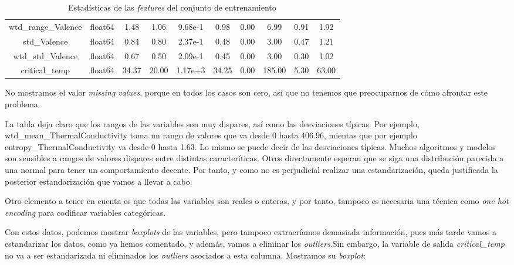 \documentclass[11pt]{article}
\begin{document}
\begin{table}[H]
{\begin{tabular}{|c|c|c|c|c|c|c|c|c|c|}
wtd\_range\_Valence                & float64&     1.48&     1.06&  9.68e-1&     0.98&    0.00&      6.99&     0.91&     1.92 \\
std\_Valence                      & float64&     0.84&     0.80&  2.37e-1&     0.48&    0.00&      3.00&     0.47&     1.21 \\
wtd\_std\_Valence                  & float64&     0.67&     0.50&  2.09e-1&     0.45&    0.00&      3.00&     0.30&     1.02 \\
critical\_temp                    & float64&    34.37&    20.00&  1.17e+3&    34.25&    0.00&    185.00&     5.30&    63.00 \\
    \hline
    \end{tabular}
    }
    \caption{Estadísticas de las \emph{features} del conjunto de entrenamiento}
    \label{Tabla con los estadísticos de las features 2}
\end{table}

No mostramos el valor \emph{missing values}, porque en todos los casos son cero, así que no tenemos que preocuparnos de cómo afrontar este problema.

La tabla deja claro que los rangos de las variables son muy dispares, así como las desviaciones típicas. Por ejemplo, wtd\_mean\_ThermalConductivity toma un rango de valores que va desde 0 hasta 406.96, mientas que por ejemplo entropy\_ThermalConductivity va desde 0 hasta 1.63. Lo mismo se puede decir de las desviaciones típicas. Muchos algoritmos y modelos son sensibles a rangos de valores dispares entre distintas caracteríticas. Otros directamente esperan que se siga una distribución parecida a una normal para tener un comportamiento decente. Por tanto, y como no es perjudicial realizar una estandarización, queda justificada la posterior estandarización que vamos a llevar a cabo.

Otro elemento a tener en cuenta es que todas las variables son reales o enteras, y por tanto, tampoco es necesaria una técnica como \emph{one hot encoding} para codificar variables categóricas.

Con estos datos, podemos mostrar \emph{boxplots} de las variables, pero tampoco extraeríamos demasiada información, pues más tarde vamos a estandarizar los datos, como ya hemos comentado, y además, vamos a eliminar los \emph{outliers}.Sin embargo, la variable de salida \emph{critical\_temp} no va a ser estandarizada ni eliminados los \emph{outliers} asociados a esta columna. Mostramos su \emph{boxplot}:
\end{document}
